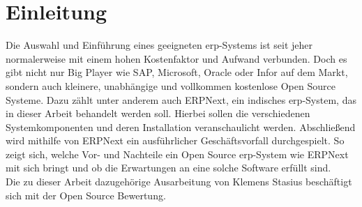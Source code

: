 \chapter{Einleitung}
\label{chap:einl}
Die Auswahl und Einführung eines geeigneten \gls{erp}-Systems ist seit jeher normalerweise mit einem hohen Kostenfaktor und Aufwand verbunden. Doch es gibt nicht nur Big Player wie SAP, Microsoft, Oracle oder Infor auf dem Markt, sondern auch kleinere, unabhängige und vollkommen kostenlose Open Source Systeme. Dazu zählt unter anderem auch ERPNext, ein indisches \gls{erp}-System, das in dieser Arbeit behandelt werden soll. Hierbei sollen die verschiedenen Systemkomponenten und deren Installation veranschaulicht werden. Abschließend wird mithilfe von ERPNext ein ausführlicher Geschäftsvorfall durchgespielt. So zeigt sich, welche Vor- und Nachteile ein Open Source \gls{erp}-System wie ERPNext mit sich bringt und ob die Erwartungen an eine solche Software erfüllt sind. \\
Die zu dieser Arbeit dazugehörige Ausarbeitung von Klemens Stasius beschäftigt sich mit der Open Source Bewertung.